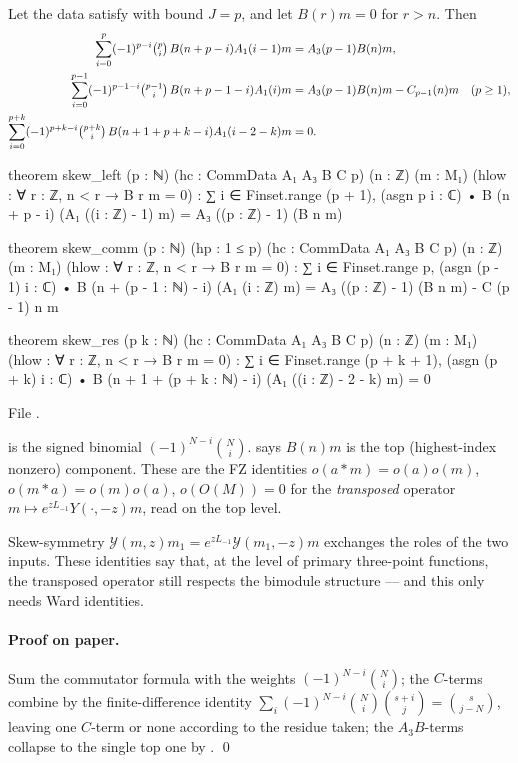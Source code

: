\begin{theorem}\label{ch14:thm:skew3}
Let the data satisfy  with bound $J=p$, and let $B(r)m=0$ for $r>n$.  Then
\begin{align*}
\sum_{i=0}^{p}(-1)^{p-i}\tbinom pi\,B(n+p-i)A_1(i-1)m&=A_3(p-1)B(n)m,\\
\sum_{i=0}^{p-1}(-1)^{p-1-i}\tbinom{p-1}{i}\,B(n+p-1-i)A_1(i)m&=A_3(p-1)B(n)m-C_{p-1}(n)m\quad(p\ge1),\\
\sum_{i=0}^{p+k}(-1)^{p+k-i}\tbinom{p+k}{i}\,B(n+1+p+k-i)A_1(i-2-k)m&=0 .
\end{align*}
\end{theorem}
\begin{leancode}
theorem skew_left (p : ℕ) (hc : CommData A₁ A₃ B C p) (n : ℤ) (m : M₁)
    (hlow : ∀ r : ℤ, n < r → B r m = 0) :
    ∑ i ∈ Finset.range (p + 1), (asgn p i : ℂ) • B (n + p - i) (A₁ ((i : ℤ) - 1) m)
      = A₃ ((p : ℤ) - 1) (B n m)

theorem skew_comm (p : ℕ) (hp : 1 ≤ p) (hc : CommData A₁ A₃ B C p) (n : ℤ) (m : M₁)
    (hlow : ∀ r : ℤ, n < r → B r m = 0) :
    ∑ i ∈ Finset.range p, (asgn (p - 1) i : ℂ) • B (n + (p - 1 : ℕ) - i) (A₁ (i : ℤ) m)
      = A₃ ((p : ℤ) - 1) (B n m) - C (p - 1) n m

theorem skew_res (p k : ℕ) (hc : CommData A₁ A₃ B C p) (n : ℤ) (m : M₁)
    (hlow : ∀ r : ℤ, n < r → B r m = 0) :
    ∑ i ∈ Finset.range (p + k + 1), (asgn (p + k) i : ℂ)
      • B (n + 1 + (p + k : ℕ) - i) (A₁ ((i : ℤ) - 2 - k) m) = 0
\end{leancode}
File .

\begin{dictionary}
 is the signed binomial $(-1)^{N-i}\binom Ni$.   says $B(n)m$ is the top
(highest-index nonzero) component.  These are the FZ identities $o(a*m)=o(a)o(m)$,
$o(m*a)=o(m)o(a)$, $o(O(M))=0$ for the \emph{transposed} operator $m\mapsto e^{zL_{-1}}Y(\cdot,-z)m$, read on
the top level.
\end{dictionary}

\begin{physics}
Skew-symmetry $\mathcal Y(m,z)m_1=e^{zL_{-1}}\mathcal Y(m_1,-z)m$ exchanges the roles of the two
inputs.  These identities say that, at the level of primary three-point functions, the transposed
operator still respects the bimodule structure — and this only needs Ward identities.
\end{physics}

\paragraph{Proof on paper.}  Sum the commutator formula with the weights $(-1)^{N-i}\binom Ni$; the
$C$-terms combine by the finite-difference identity $\sum_i(-1)^{N-i}\binom Ni\binom{s+i}j=\binom{s}{j-N}$,
leaving one $C$-term or none according to the residue taken; the $A_3B$-terms collapse to the single
top one by . \qed

